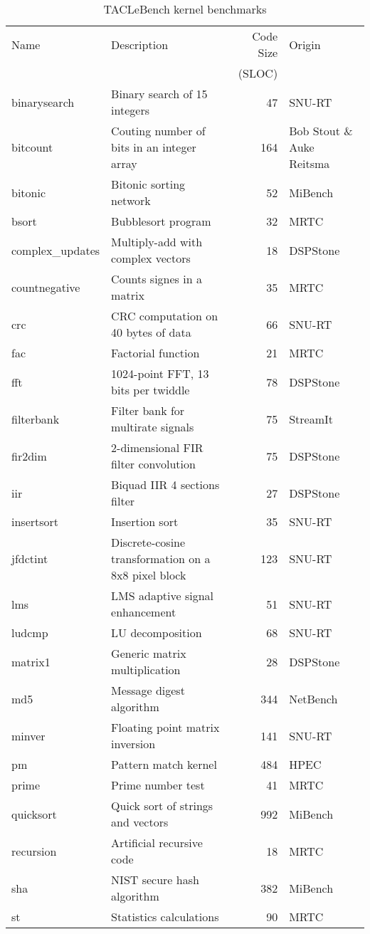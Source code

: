 \documentclass[a4paper,UKenglish]{oasics}
\begin{document}
\begin{table}[t!]
\centering
\caption{\label{tab:bench_kernel}TACLeBench kernel benchmarks}
\begin{tabular}{lL{5.5cm}rR{2.5cm}}
\toprule
Name & Description & Code Size & Origin\\
     &             &     (SLOC) & \\ \midrule
binarysearch & Binary search of 15 integers & 47 & SNU-RT \\
bitcount & Couting number of bits in an integer array & 164  & Bob Stout \& Auke Reitsma\\
bitonic &  Bitonic sorting network  & 52 & MiBench \\
bsort & Bubblesort program & 32 & MRTC \\
complex\_updates &  Multiply-add with complex vectors & 18 & DSPStone \\
countnegative &  Counts signes in a matrix  & 35 & MRTC \\
crc &  CRC computation on 40 bytes of data  & 66 & SNU-RT \\
fac &  Factorial function & 21 & MRTC \\
fft &  1024-point FFT, 13 bits per twiddle  & 78  & DSPStone \\
filterbank & Filter bank for multirate signals  & 75 & StreamIt \\
fir2dim &  2-dimensional FIR filter convolution & 75 & DSPStone \\
iir &  Biquad IIR 4 sections filter & 27 & DSPStone \\
insertsort & Insertion sort & 35 & SNU-RT \\
jfdctint & Discrete-cosine transformation on a 8x8 pixel block  & 123  & SNU-RT \\
lms &  LMS adaptive signal enhancement  & 51  & SNU-RT \\
ludcmp & LU decomposition & 68 & SNU-RT \\
matrix1 &  Generic matrix multiplication  & 28 & DSPStone \\
md5 &  Message digest algorithm & 344  & NetBench \\
minver & Floating point matrix inversion  & 141  & SNU-RT \\
pm & Pattern match kernel & 484  & HPEC \\
prime &  Prime number test  & 41 & MRTC \\
quicksort &  Quick sort of strings and  vectors & 992 & MiBench \\
recursion &  Artificial recursive code  & 18 & MRTC \\
sha &  NIST secure hash algorithm & 382  & MiBench \\
st & Statistics calculations & 90  & MRTC \\
\bottomrule
\end{tabular}
\end{table}
\end{document}
